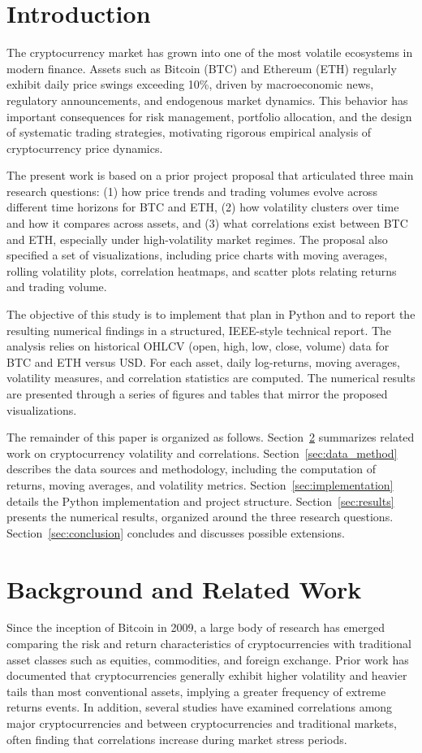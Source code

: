\documentclass[conference]{IEEEtran}
\begin{document}
\section{Introduction}
The cryptocurrency market has grown into one of the most volatile ecosystems in modern finance. Assets such as Bitcoin (BTC) and Ethereum (ETH) regularly exhibit daily price swings exceeding 10\%, driven by macroeconomic news, regulatory announcements, and endogenous market dynamics. This behavior has important consequences for risk management, portfolio allocation, and the design of systematic trading strategies, motivating rigorous empirical analysis of cryptocurrency price dynamics.

The present work is based on a prior project proposal that articulated three main research questions: (1) how price trends and trading volumes evolve across different time horizons for BTC and ETH, (2) how volatility clusters over time and how it compares across assets, and (3) what correlations exist between BTC and ETH, especially under high-volatility market regimes. The proposal also specified a set of visualizations, including price charts with moving averages, rolling volatility plots, correlation heatmaps, and scatter plots relating returns and trading volume.

The objective of this study is to implement that plan in Python and to report the resulting numerical findings in a structured, IEEE-style technical report. The analysis relies on historical OHLCV (open, high, low, close, volume) data for BTC and ETH versus USD. For each asset, daily log-returns, moving averages, volatility measures, and correlation statistics are computed. The numerical results are presented through a series of figures and tables that mirror the proposed visualizations.

The remainder of this paper is organized as follows. Section~\ref{sec:background} summarizes related work on cryptocurrency volatility and correlations. Section~\ref{sec:data_method} describes the data sources and methodology, including the computation of returns, moving averages, and volatility metrics. Section~\ref{sec:implementation} details the Python implementation and project structure. Section~\ref{sec:results} presents the numerical results, organized around the three research questions. Section~\ref{sec:conclusion} concludes and discusses possible extensions.

\section{Background and Related Work}
\label{sec:background}
Since the inception of Bitcoin in 2009, a large body of research has emerged comparing the risk and return characteristics of cryptocurrencies with traditional asset classes such as equities, commodities, and foreign exchange. Prior work has documented that cryptocurrencies generally exhibit higher volatility and heavier tails than most conventional assets, implying a greater frequency of extreme returns events. In addition, several studies have examined correlations among major cryptocurrencies and between cryptocurrencies and traditional markets, often finding that correlations increase during market stress periods.
\end{document}
